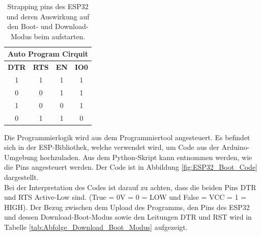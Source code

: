 \begin{table}[h!]
\center
\begin{tabular}{|c|c||c|c|}
\hline
\multicolumn{4}{|c|}{\textbf{Auto Program Cirquit}}\\
\hline
\textbf{DTR} & \textbf{RTS} & \textbf{EN} & \textbf{IO0} \\
\hline
1 & 1 & 1 & 1 \\
\hline
0 & 0 & 1 & 1 \\
\hline
1 & 0 & 0 & 1 \\
\hline
0 & 1 & 1 & 0 \\
\hline
\end{tabular}

\caption{Strapping pins des ESP32 und deren Auswirkung auf den Boot- und Download-Modus beim aufstarten.}
\label{tab:Einfluss_Boot_Schaltung}
\end{table}

Die Programmierlogik wird aus dem Programmiertool angesteuert. Es befindet sich in der ESP-Bibliothek, welche verwendet wird, um Code aus der Arduino-Umgebung hochzuladen. Aus dem Python-Skript kann entnommen werden, wie die Pins angesteuert werden. Der Code ist in Abbildung \ref{fig:ESP32_Boot_Code} dargestellt.\\
Bei der Interpretation des Codes ist darauf zu achten, dass die beiden Pins DTR und RTS Active-Low sind. (True = 0V = 0 = LOW und False = VCC = 1 = HIGH). Der Bezug zwischen dem Upload des Programms, den Pins des ESP32 und dessen Download-Boot-Modus sowie den Leitungen DTR und RST wird in Tabelle \ref{tab:Abfolge_Download_Boot_Modus} aufgezeigt.


